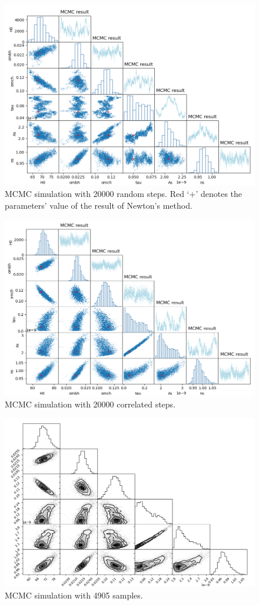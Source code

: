 \documentclass[showpacs, oneside, onecolumn, prl, amsmath, amssymb, nofootinbib, superscriptaddress, notitlepage]{revtex4-1}
\newcommand\bfig{\begin{figure}}
\newcommand\efig{\end{figure}}
\begin{document}
\bfig
	\centering
	\includegraphics[scale=0.72]{3-4-1(20000).png}
	\caption{MCMC simulation with 20000 random steps. Red `+' denotes the parameters' value of the result of Newton's method.}
	\label{3-4-1-20000}
\efig

\bfig
	\centering
	\includegraphics[scale=0.72]{3-4-3(20000).png}
	\caption{MCMC simulation with 20000 correlated steps.}
	\label{3-4-3-20000}
\efig

\bfig
	\centering
	\includegraphics[scale=0.5]{3-4-3(20000)s.png}
	\caption{MCMC simulation with 4905 samples.}
	\label{3-4-6}
\efig
\end{document}
